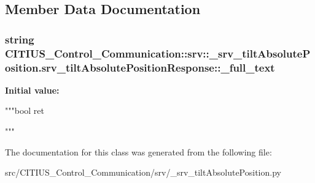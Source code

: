 \subsection{\-Member \-Data \-Documentation}
\hypertarget{class_c_i_t_i_u_s___control___communication_1_1srv_1_1__srv__tilt_absolute_position_1_1srv__tilt_absolute_position_response_ac119cba0aa004c98e635d530ba946271}{
\subsubsection[{\-\_\-full\-\_\-text}]{\setlength{\rightskip}{0pt plus 5cm}string \-C\-I\-T\-I\-U\-S\-\_\-\-Control\-\_\-\-Communication\-::srv\-::\-\_\-srv\-\_\-tilt\-Absolute\-Position.\-srv\-\_\-tilt\-Absolute\-Position\-Response\-::\-\_\-full\-\_\-text}}\label{class_c_i_t_i_u_s___control___communication_1_1srv_1_1__srv__tilt_absolute_position_1_1srv__tilt_absolute_position_response_ac119cba0aa004c98e635d530ba946271}
{\bfseries \-Initial value\-:}
\begin{DoxyCode}
"""bool ret


"""
\end{DoxyCode}


\-The documentation for this class was generated from the following file\-:\begin{DoxyCompactItemize}
\item 
src/\-C\-I\-T\-I\-U\-S\-\_\-\-Control\-\_\-\-Communication/srv/\-\_\-srv\-\_\-tilt\-Absolute\-Position.\-py\end{DoxyCompactItemize}
